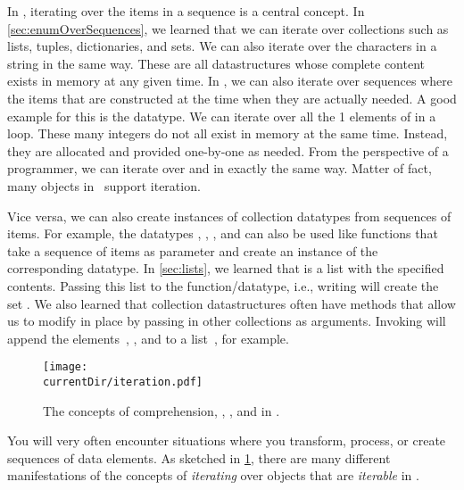 %
\label{sec:iteration}%
%
In \python, iterating over the items in a sequence is a central concept.
In \cref{sec:enumOverSequences}, we learned that we can iterate over collections such as lists, tuples, dictionaries, and sets.
We can also iterate over the characters in a string in the same way.
These are all datastructures whose complete content exists in memory at any given time.
In \python, we can also iterate over sequences where the items that are constructed at the time when they are actually needed.
A good example for this is the  datatype.
We can iterate over all the 1  elements of  in a loop.
These many integers do not all exist in memory at the same time.
Instead, they are allocated and provided one-by-one as needed.
From the perspective of a programmer, we can iterate over  and  in exactly the same way.
Matter of fact, many objects in \python\ support iteration.

Vice versa, we can also create instances of collection datatypes from sequences of items.
For example, the datatypes , , , and  can also be used like functions that take a sequence of items as parameter and create an instance of the corresponding datatype.
In \cref{sec:lists}, we learned that \pythonil{[1, 2, 2, 3]} is a list  with the specified contents.
Passing this list to the  function/datatype, i.e., writing  will create the set .
We also learned that collection datastructures often have methods that allow us to modify in place by passing in other collections as arguments.
Invoking  will append the elements~, , and  to a list~, for example.

\begin{figure}%
\centering%
\texttt{[image: \\currentDir/iteration.pdf]}%
\caption{The concepts of comprehension, , , and  in \python.}%
\label{fig:iteration}%
\end{figure}%

You will very often encounter situations where you transform, process, or create sequences of data elements.
As sketched in \cref{fig:iteration}, there are many different manifestations of the concepts of \emph{iterating} over objects that are \emph{iterable} in \python.

